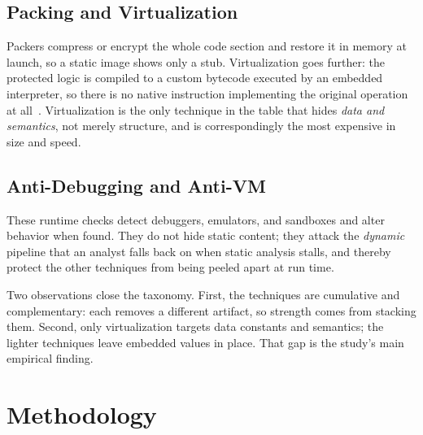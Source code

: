 \documentclass[conference]{IEEEtran}
\begin{document}
\subsection{Packing and Virtualization}
Packers compress or encrypt the whole code section and restore it in memory at
launch, so a static image shows only a stub. Virtualization goes further:
the protected logic is compiled to a custom bytecode executed by an embedded
interpreter, so there is no native instruction implementing the original
operation at all~\cite{protecting-survey}. Virtualization is the only technique
in the table that hides \emph{data and semantics}, not merely structure, and is
correspondingly the most expensive in size and speed.

\subsection{Anti-Debugging and Anti-VM}
These runtime checks detect debuggers, emulators, and sandboxes and alter
behavior when found. They do not hide static content; they attack the
\emph{dynamic} pipeline that an analyst falls back on when static analysis
stalls, and thereby protect the other techniques from being peeled apart at run
time.

Two observations close the taxonomy. First, the techniques are cumulative and
complementary: each removes a different artifact, so strength comes from stacking
them. Second, only virtualization targets data constants and semantics; the
lighter techniques leave embedded values in place. That gap is the study's main
empirical finding.

\section{Methodology}\label{sec:method}
\end{document}
